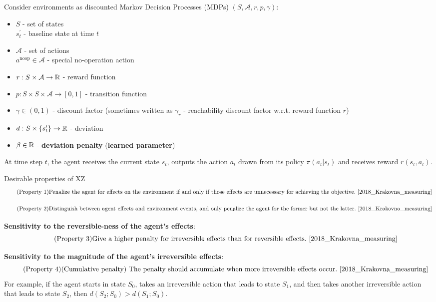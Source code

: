 Consider environments as discounted Markov Decision Processes (MDPs) $(S, \mathcal{A}, r, p, \gamma)$:
\begin{itemize}
	\item $S$ - set of states\\
	$s_t^\prime$ - baseline state at time $t$
	\item $\mathcal{A}$ - set of actions\\
	$a^{\text{noop}}\in \mathcal{A}$ - special no-operation action
	\item $r: S\times \mathcal{A} \to \mathbb{R}$ - reward function
	\item $p: S\times S\times \mathcal{A} \to [0,1]$ - transition function
	\item $\gamma \in (0,1)$ - discount factor (sometimes written as $\gamma_r$ - reachability discount factor w.r.t. reward function $r$)
	\item $d: S\times \{ s_t^\prime \} \to \mathbb{R}$ - deviation
	\item $\beta\in \mathbb{R}$ - \textbf{deviation penalty} (\textbf{learned parameter})
\end{itemize}
At time step $t$, the agent receives the current state $s_t$, outputs the action $a_t$ drawn from its policy $\pi(a_t| s_t)$ and receives reward $r(s_t, a_t)$.

\begin{Definition}{Desirable properties of XZ}{}{} %
	\begin{equation}\label{eq:Property1} \tag{Property 1}
		\text{Penalize the agent for effects on the environment if and only if those effects are unnecessary for achieving the objective.~\cite{2018_Krakovna_measuring}}
	\end{equation}
	
	\begin{equation}\label{eq:Property2} \tag{Property 2}
		\text{Distinguish between agent effects and environment events, and only penalize the agent for the former but not the latter.~\cite{2018_Krakovna_measuring}}
	\end{equation}
	
	\textbf{Sensitivity to the reversible-ness of the agent's effects}:
	\begin{equation}\label{eq:Property3} \tag{Property 3}
		\text{Give a higher penalty for irreversible effects than for reversible effects.~\cite{2018_Krakovna_measuring}}
	\end{equation}
	
	\textbf{Sensitivity to the magnitude of the agent’s irreversible effects}:
	\begin{equation}\label{eq:Property4} \tag{Property 4}
		\text{(Cumulative penalty) The penalty should accumulate when more irreversible effects occur.~\cite{2018_Krakovna_measuring}}		
	\end{equation}
	For example, if the agent starts in state $S_0$, takes an irreversible action that leads to state $S_1$, and then takes another irreversible action that leads to state $S_2$, then $d(S_2; S_0) > d(S_1;S_0)$.
\end{Definition}

